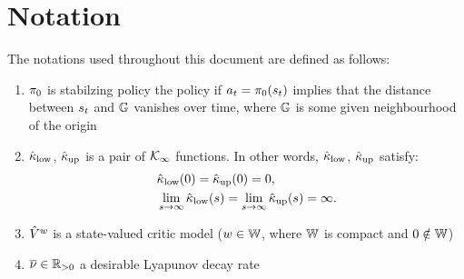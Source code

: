 \documentclass[12pt,twoside]{../../mitthesis}
\begin{document}
\section*{Notation}
The notations used throughout this document are defined as follows:
\begin{enumerate}
    \item $\pi_0$ is stabilzing policy \ie the policy if $a_t = \pi_0(s_t)$  implies that the
    distance between $s_t$ and ${\mathbb{G}}$ vanishes over time, where ${\mathbb{G}}$ is some given neighbourhood of the origin
    \item $\hat \kappa_{\text{low}}$, $\hat \kappa_{\text{up}}$ is a pair of $\mathcal{K}_{\infty}$ functions.
    In other words, $\hat \kappa_{\text{low}}$, $\hat \kappa_{\text{up}}$ satisfy:
    \begin{align*}
         & \hat \kappa_{\text{low}}(0) = \hat \kappa_{\text{up}}(0) = 0,                                                            \\
         & \lim\limits_{s \rightarrow \infty} \hat \kappa_{\text{low}}(s) = \lim\limits_{s \rightarrow \infty} \hat \kappa_{\text{up}}(s) = \infty.
    \end{align*}
    \item $\hat {V}^w$ is a state-valued critic model ($w \in {\mathbb{W}}$, where ${\mathbb{W}}$ is compact and $0 \notin {\mathbb{W}}$)
    \item $\overline{\nu} \in {\mathbb{R}}_{>0}$ a desirable Lyapunov decay rate 
\end{enumerate}
\end{document}
